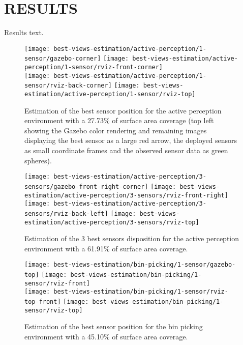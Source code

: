 \section{\uppercase{Results}}\label{sec:results}

\noindent Results text.

\begin{figure}
	\centering
	\texttt{[image: best-views-estimation/active-perception/1-sensor/gazebo-corner]}\hspace{4em}
	\texttt{[image: best-views-estimation/active-perception/1-sensor/rviz-front-corner]}\\
	\texttt{[image: best-views-estimation/active-perception/1-sensor/rviz-back-corner]}\hspace{2em}
	\texttt{[image: best-views-estimation/active-perception/1-sensor/rviz-top]}
	\caption{Estimation of the best sensor position for the active perception environment with a 27.73\% of surface area coverage (top left showing the Gazebo color rendering and remaining images displaying the best sensor as a large red arrow, the deployed sensors as small coordinate frames and the observed sensor data as green spheres).}
\end{figure}

\begin{figure}
	\centering
	\texttt{[image: best-views-estimation/active-perception/3-sensors/gazebo-front-right-corner]}\hspace{4em}
	\texttt{[image: best-views-estimation/active-perception/3-sensors/rviz-front-right]}\\
	\texttt{[image: best-views-estimation/active-perception/3-sensors/rviz-back-left]}\hspace{2em}
	\texttt{[image: best-views-estimation/active-perception/3-sensors/rviz-top]}
	\caption{Estimation of the 3 best sensors disposition for the active perception environment with a 61.91\% of surface area coverage.}
\end{figure}

\begin{figure}
	\centering
	\texttt{[image: best-views-estimation/bin-picking/1-sensor/gazebo-top]}\hspace{2em}
	\texttt{[image: best-views-estimation/bin-picking/1-sensor/rviz-front]}\\
	\texttt{[image: best-views-estimation/bin-picking/1-sensor/rviz-top-front]}\hspace{2em}
	\texttt{[image: best-views-estimation/bin-picking/1-sensor/rviz-top]}
	\caption{Estimation of the best sensor position for the bin picking environment with a 45.10\% of surface area coverage.}
\end{figure}

